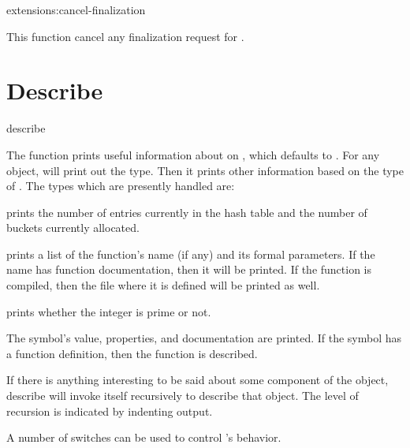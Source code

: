 \begin{defun}{extensions:}{cancel-finalization}{}
  
  This function cancel any finalization request for .
\end{defun}


\section{Describe}

\begin{defun}{}{describe}{ }
  
  The  function prints useful information about
   on , which defaults to
  .  For any object,  will
  print out the type.  Then it prints other information based on the
  type of .  The types which are presently handled are:

  \begin{Lentry}
  
  \item[\tindexed{hash-table}]  prints the number of
    entries currently in the hash table and the number of buckets
    currently allocated.
  
  \item[\tindexed{function}]  prints a list of the
    function's name (if any) and its formal parameters.  If the name
    has function documentation, then it will be printed.  If the
    function is compiled, then the file where it is defined will be
    printed as well.
  
  \item[\tindexed{fixnum}]  prints whether the integer
    is prime or not.
  
  \item[\tindexed{symbol}] The symbol's value, properties, and
    documentation are printed.  If the symbol has a function
    definition, then the function is described.
  \end{Lentry}
  If there is anything interesting to be said about some component of
  the object, describe will invoke itself recursively to describe that
  object.  The level of recursion is indicated by indenting output.
\end{defun}

A number of switches can be used to control 's behavior.

